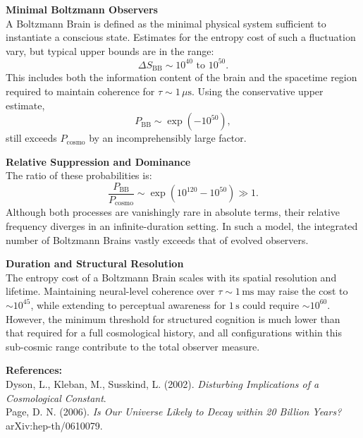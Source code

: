 \begin{technical}
\noindent\textbf{Minimal Boltzmann Observers}\\[0.5em]
A Boltzmann Brain is defined as the minimal physical system sufficient to instantiate a conscious state. Estimates for the entropy cost of such a fluctuation vary, but typical upper bounds are in the range:
\[
\Delta S_\text{BB} \sim 10^{40} \text{ to } 10^{50}.
\]
This includes both the information content of the brain and the spacetime region required to maintain coherence for \( \tau \sim 1 \,\mu\text{s} \). Using the conservative upper estimate,
\[
P_\text{BB} \sim \exp(-10^{50}),
\]
still exceeds \( P_\text{cosmo} \) by an incomprehensibly large factor.

\noindent\textbf{Relative Suppression and Dominance}\\[0.5em]
The ratio of these probabilities is:
\[
\frac{P_\text{BB}}{P_\text{cosmo}} \sim \exp(10^{120} - 10^{50}) \gg 1.
\]
Although both processes are vanishingly rare in absolute terms, their relative frequency diverges in an infinite-duration setting. In such a model, the integrated number of Boltzmann Brains vastly exceeds that of evolved observers.

\noindent\textbf{Duration and Structural Resolution}\\[0.5em]
The entropy cost of a Boltzmann Brain scales with its spatial resolution and lifetime. Maintaining neural-level coherence over \( \tau \sim 1 \,\text{ms} \) may raise the cost to \( \sim 10^{45} \), while extending to perceptual awareness for \( 1 \,\text{s} \) could require \( \sim 10^{60} \). However, the minimum threshold for structured cognition is much lower than that required for a full cosmological history, and all configurations within this sub-cosmic range contribute to the total observer measure.

\vspace{0.5em}
\noindent\textbf{References:}\\
Dyson, L., Kleban, M., Susskind, L. (2002). \textit{Disturbing Implications of a Cosmological Constant}.\\
Page, D. N. (2006). \textit{Is Our Universe Likely to Decay within 20 Billion Years?} arXiv:hep-th/0610079.
\end{technical}
